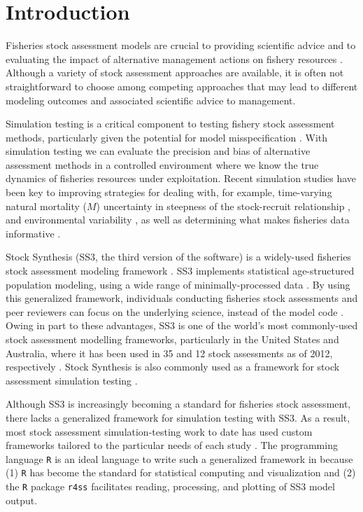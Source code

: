 \documentclass[12pt]{article}
\begin{document}

\section*{Introduction}

Fisheries stock assessment models are crucial to providing scientific advice and to evaluating the impact of alternative management actions on fishery resources \cite{gulland1983, hilborn1992}. Although a variety of stock assessment approaches are available, it is often not straightforward to choose among competing approaches that may lead to different modeling outcomes and associated scientific advice to management.

Simulation testing is a critical component to testing fishery stock assessment methods, particularly given the potential for model misspecification \cite{hilborn1987, hilborn1992, rosenberg1994, peterman2004, deroba2013a}. With simulation testing we can evaluate the precision and bias of alternative assessment methods in a controlled environment where we know the true dynamics of fisheries resources under exploitation. Recent simulation studies have been key to improving strategies for dealing with, for example, time-varying natural mortality ($M$) \cite{lee2011, jiao2012, deroba2013, johnson2013} uncertainty in steepness of the stock-recruit relationship \cite{lee2012}, and environmental variability \cite{schirripa2009}, as well as determining what makes fisheries data informative \cite{magnusson2007, wetzel2011a, ono2013, yin2004}.

Stock Synthesis (SS3, the third version of the software) is a widely-used fisheries stock assessment modeling framework \cite{methot2013}. SS3 implements statistical age-structured population modeling, using a wide range of minimally-processed data \cite{maunder2013, methot2013}. By using this generalized framework, individuals conducting fisheries stock assessments and peer reviewers can focus on the underlying science, instead of the model code \cite{methot2013}. Owing in part to these advantages, SS3 is one of the world's most commonly-used stock assessment modelling frameworks, particularly in the United States and Australia, where it has been used in 35 and 12 stock assessments as of 2012, respectively \cite{methot2013}. Stock Synthesis is also commonly used as a framework for stock assessment simulation testing \cite{helu2000, yin2004, schirripa2009, lee2011, jiao2012, lee2012, crone2013a, hurtadoferro2013}.

Although SS3 is increasingly becoming a standard for fisheries stock assessment, there lacks a generalized framework for simulation testing with SS3. As a result, most stock assessment simulation-testing work to date has used custom frameworks tailored to the particular needs of each study \cite{helu2000, yin2004, magnusson2007, wetzel2011a, jiao2012, wilberg2006, deroba2013a, deroba2013, crone2013a, hurtadoferro2013}. The programming language \texttt{R} \cite{rcoreteam2013} is an ideal language to write such a generalized framework in because (1) \texttt{R} has become the standard for statistical computing and visualization and (2) the \texttt{R} package \texttt{r4ss} \cite{r4ss2013} facilitates reading, processing, and plotting of SS3 model output.
\end{document}
